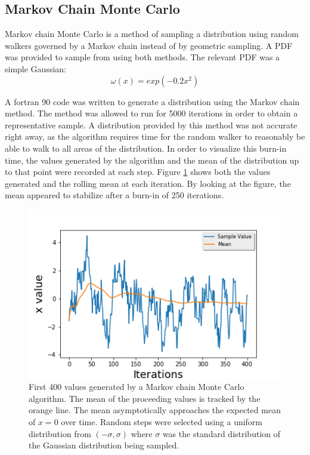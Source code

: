 \documentclass[twocolumn]{article}
\begin{document}
\subsection{Markov Chain Monte Carlo}
 Markov chain Monte Carlo is a method of sampling a distribution using random walkers governed by a Markov chain instead of by geometric sampling. A PDF was provided to sample from using both methods. The relevant PDF was a simple Gaussian:
 \begin{equation}
 \omega(x) = exp(-0.2x^2)
 \label{lilgauss}
 \end{equation}
 
 A fortran 90 code was written to generate a distribution using the Markov chain method. The method was allowed to run for 5000 iterations in order to obtain a representative sample. A distribution provided by this method was not accurate right away, as the algorithm requires time for the random walker to reasonably be able to walk to all areas of the distribution. In order to visualize this burn-in time, the values generated by the algorithm and the mean of the distribution up to that point were recorded at each step. Figure \ref{fig:MCMCmean} shows both the values generated and the rolling mean at each iteration. By looking at the figure, the mean appeared to stabilize after a burn-in of 250 iterations. 
 
 \begin{figure}
\centering
\includegraphics[width=\linewidth]{MCMCmean}
\caption{First 400 values generated by a Markov chain Monte Carlo algorithm. The mean of the proceeding values is tracked by the orange line. The mean asymptotically approaches the expected mean of $x=0$ over time. Random steps were selected using a uniform distribution from $(-\sigma, \sigma)$ where $\sigma$ was the standard distribution of the Gaussian distribution being sampled.}
\label{fig:MCMCmean}
\end{figure}
\end{document}
